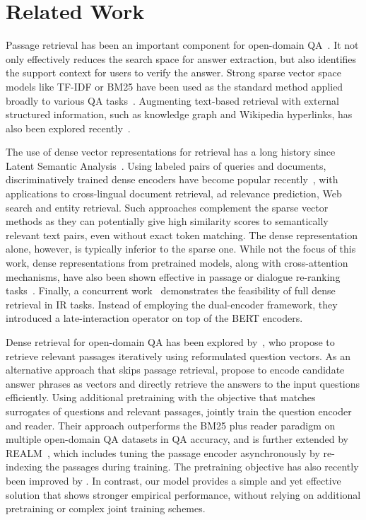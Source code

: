 \documentclass[11pt,a4paper]{article}
\begin{document}
 

\section{Related Work}
\label{sec:related}


Passage retrieval has been an important component for open-domain QA~\cite{voorhees1999trec}.
It not only effectively reduces the search space for answer extraction, but also identifies the support context for users to verify the answer.
Strong sparse vector space models like TF-IDF or BM25 have been used as the standard method applied broadly to various QA tasks~\citep[e.g.,][]{chen2017reading, yang2019end, Yang2019Data, nie2019revealing, min2019discrete, wolfson2020break}.
Augmenting text-based retrieval with external structured information, such as knowledge graph and Wikipedia hyperlinks, has also been explored recently~\cite{min2019knowledge,asai2020learning}.


The use of dense vector representations for retrieval has a long history since Latent Semantic Analysis~\cite{deerwester1990indexing}.
Using labeled pairs of queries and documents, discriminatively trained dense encoders have become popular recently~\cite{yih2011learning, huang2013learning, gillick-etal-2019-learning}, with applications to cross-lingual document retrieval, ad relevance prediction, Web search and entity retrieval. Such approaches complement the sparse vector methods as they can potentially give high similarity scores to semantically relevant text pairs, even without exact token matching. The dense representation alone, however, is typically inferior to the sparse one.
While not the focus of this work, dense representations from pretrained models, along with cross-attention mechanisms, have also been shown effective in passage or dialogue re-ranking tasks~\cite{nogueira2019passage,humeau2020poly}. 
Finally, a concurrent work~\cite{khattab2020colbert} demonstrates the feasibility of full dense retrieval in IR tasks. Instead of employing the dual-encoder framework, they introduced a late-interaction operator on top of the BERT encoders.






Dense retrieval for open-domain QA has been explored by~\citet{das2019multi}, who propose to retrieve relevant passages iteratively using reformulated question vectors.
As an alternative approach that skips passage retrieval, \citet{seo2019real} propose to encode candidate answer phrases as vectors and directly retrieve the answers to the input questions efficiently.
Using additional pretraining with the objective that matches surrogates of questions and relevant passages, \citet{lee2019latent} jointly train the question encoder and reader.
Their approach outperforms the BM25 plus reader paradigm on multiple open-domain QA datasets in QA accuracy, and is further extended by REALM~\cite{guu2020realm}, which includes tuning the passage encoder asynchronously by re-indexing the passages during training.
The pretraining objective has also recently been improved by \citet{Xiong2020ProgressivelyPD}.
In contrast, our model provides a simple and yet effective solution that shows stronger empirical performance, without relying on additional pretraining or complex joint training schemes.
\end{document}
